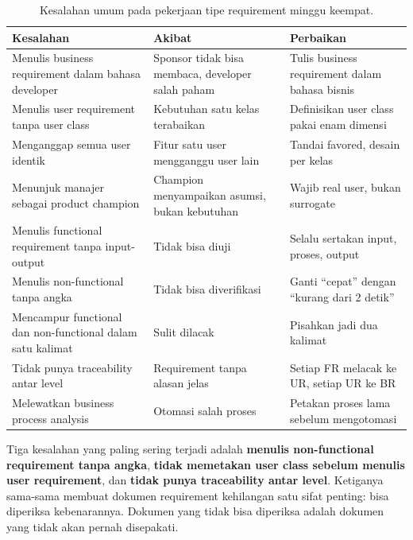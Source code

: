 \documentclass[11pt,a4paper]{article}
\begin{document}
\begin{table}[H]
	\centering
	\caption{Kesalahan umum pada pekerjaan tipe requirement minggu keempat.}
	\label{tab:mistakes}
	\footnotesize
	\begin{tabularx}{\textwidth}{l X X}
		\toprule
		Kesalahan                                                  & Akibat                                            & Perbaikan                                      \\
		\midrule
		Menulis business requirement dalam bahasa developer        & Sponsor tidak bisa membaca, developer salah paham & Tulis business requirement dalam bahasa bisnis \\
		Menulis user requirement tanpa user class                  & Kebutuhan satu kelas terabaikan                   & Definisikan user class pakai enam dimensi      \\
		Menganggap semua user identik                              & Fitur satu user mengganggu user lain              & Tandai favored, desain per kelas               \\
		Menunjuk manajer sebagai product champion                  & Champion menyampaikan asumsi, bukan kebutuhan     & Wajib real user, bukan surrogate               \\
		Menulis functional requirement tanpa input-output          & Tidak bisa diuji                                  & Selalu sertakan input, proses, output          \\
		Menulis non-functional tanpa angka                         & Tidak bisa diverifikasi                           & Ganti ``cepat'' dengan ``kurang dari 2 detik'' \\
		Mencampur functional dan non-functional dalam satu kalimat & Sulit dilacak                                     & Pisahkan jadi dua kalimat                      \\
		Tidak punya traceability antar level                       & Requirement tanpa alasan jelas                    & Setiap FR melacak ke UR, setiap UR ke BR       \\
		Melewatkan business process analysis                       & Otomasi salah proses                              & Petakan proses lama sebelum mengotomasi        \\
		\bottomrule
	\end{tabularx}
\end{table}

Tiga kesalahan yang paling sering terjadi adalah \textbf{menulis non-functional requirement tanpa angka}, \textbf{tidak memetakan user class sebelum menulis user requirement}, dan \textbf{tidak punya traceability antar level}. Ketiganya sama-sama membuat dokumen requirement kehilangan satu sifat penting: bisa diperiksa kebenarannya. Dokumen yang tidak bisa diperiksa adalah dokumen yang tidak akan pernah disepakati.
\end{document}
